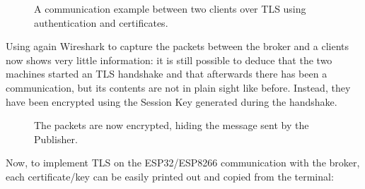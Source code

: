 \documentclass[target=bach,aauheader=,style=]{thud}
\begin{document}
\begin{figure}[h!]
	\centering
	\caption{A communication example between two clients over TLS using authentication and certificates.}
	\label{fig:tlspubsub}
\end{figure}

Using again Wireshark to capture the packets between the broker and a clients now shows very little information: it is still possible to deduce that the two machines started an TLS handshake and that afterwards there has been a communication, but its contents are not in plain sight like before. Instead, they have been encrypted using the Session Key generated during the handshake.

\begin{figure}[h!]
	\centering
	\caption{The packets are now encrypted, hiding the message sent by the Publisher.}
	\label{fig:wiresharktls}
\end{figure}


Now, to implement TLS on the ESP32/ESP8266 communication with the broker, each certificate/key can be easily printed out and copied from the terminal:
\end{document}
